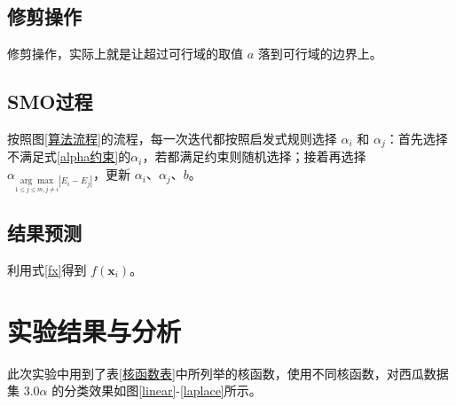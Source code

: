 \documentclass{ctexart}
\begin{document}
	\subsection{修剪操作}
	修剪操作，实际上就是让超过可行域的取值 $a$ 落到可行域的边界上。
	
	\subsection{SMO过程}
	按照图\ref{算法流程}的流程，每一次迭代都按照启发式规则选择 $\alpha_{i}$ 和 $\alpha_{j}$：首先选择不满足式\eqref{alpha约束}的$\alpha_{i}$，若都满足约束则随机选择；接着再选择 $\alpha_{\underset{1\leqslant j\leqslant m,j\neq i}{\arg \max }|E_i-E_j|}$，更新 $\alpha_{i}$、$\alpha_{j}$、$b$。\\
	
	\subsection{结果预测}
	利用式\eqref{fx}得到 $f(\boldsymbol{x}_i)$。
	
	\section{实验结果与分析}
	
	此次实验中用到了表\ref{核函数表}中所列举的核函数，使用不同核函数，对西瓜数据集 $3.0\alpha$ 的分类效果如图\ref{linear}-\ref{laplace}所示。
	
\end{document}
